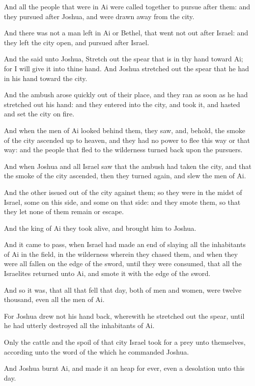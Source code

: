 \Verse And all the people that were in Ai were called together to pursue after them: and they pursued after Joshua, and were drawn away from the city.

\Verse And there was not a man left in Ai or Bethel, that went not out after Israel: and they left the city open, and pursued after Israel.

\Verse And the \LORD said unto Joshua, Stretch out the spear that is in thy hand toward Ai; for I will give it into thine hand. And Joshua stretched out the spear that he had in his hand toward the city.

\Verse And the ambush arose quickly out of their place, and they ran as soon as he had stretched out his hand: and they entered into the city, and took it, and hasted and set the city on fire.

\Verse And when the men of Ai looked behind them, they saw, and, behold, the smoke of the city ascended up to heaven, and they had no power to flee this way or that way: and the people that fled to the wilderness turned back upon the pursuers.

\Verse And when Joshua and all Israel saw that the ambush had taken the city, and that the smoke of the city ascended, then they turned again, and slew the men of Ai.

\Verse And the other issued out of the city against them; so they were in the midst of Israel, some on this side, and some on that side: and they smote them, so that they let none of them remain or escape.

\Verse And the king of Ai they took alive, and brought him to Joshua.

\Verse And it came to pass, when Israel had made an end of slaying all the inhabitants of Ai in the field, in the wilderness wherein they chased them, and when they were all fallen on the edge of the sword, until they were consumed, that all the Israelites returned unto Ai, and smote it with the edge of the sword.

\Verse And so it was, that all that fell that day, both of men and women, were twelve thousand, even all the men of Ai.

\Verse For Joshua drew not his hand back, wherewith he stretched out the spear, until he had utterly destroyed all the inhabitants of Ai.

\Verse Only the cattle and the spoil of that city Israel took for a prey unto themselves, according unto the word of the \LORD which he commanded Joshua.

\Verse And Joshua burnt Ai, and made it an heap for ever, even a desolation unto this day.

